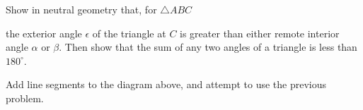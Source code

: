 \documentclass[noauthor,nooutcomes,12pt,hints]{ximera}
\begin{document}
\begin{problem}
  Show in neutral geometry that, for $\triangle ABC$
\begin{image}
\end{image}
the exterior angle $\epsilon$ of the triangle at $C$ is greater than
either remote interior angle $\alpha$ or $\beta$. Then show that the
sum of any two angles of a triangle is less than $180^{\circ}$.


\begin{hint}
Add line segments to the diagram above, and attempt to use the
previous problem.
\end{hint}




\end{problem}
\end{document}
